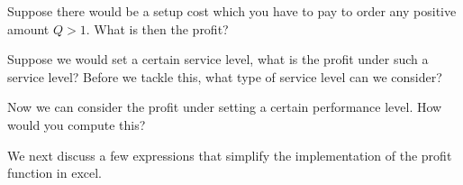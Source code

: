 \begin{exercise}
  Suppose there would be a setup cost which you have to pay to order any positive amount $Q>1$. What is then the profit? 

\end{exercise}

\begin{exercise}
Suppose we would set a certain service level, what is the profit under such a service level? Before we tackle this, what type of service level can we consider? 

\end{exercise}

\begin{exercise}
  Now we can consider the profit under setting a certain performance level. How would you compute this?

\end{exercise}

We next  discuss a few expressions that simplify the implementation of the profit function in excel.


